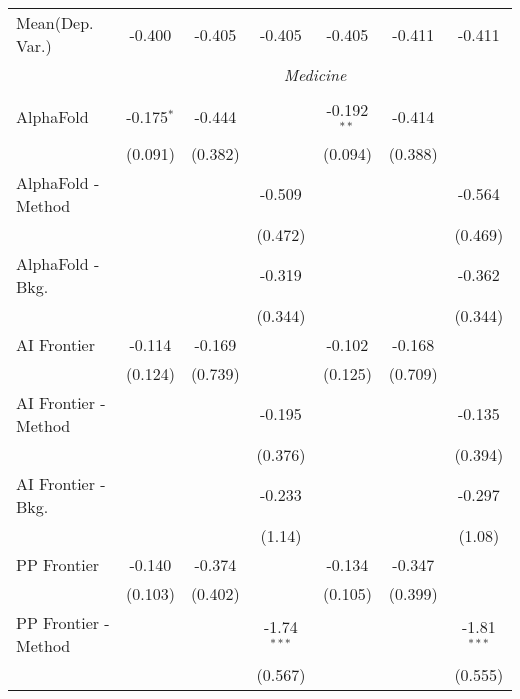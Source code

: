 \begin{tabular}{lcccccc}
Mean(Dep. Var.) & -0.400 & -0.405 & -0.405 & -0.405 & -0.411 & -0.411 \\
 & \multicolumn{6}{c}{\textit{Medicine}} \\ \\
   AlphaFold            & -0.175$^{*}$ & -0.444  &               & -0.192$^{**}$ & -0.414        &   \\   
                        & (0.091)      & (0.382) &               & (0.094)       & (0.388)       &   \\   
   AlphaFold - Method   &              &         & -0.509        &               &               & -0.564\\   
                        &              &         & (0.472)       &               &               & (0.469)\\   
   AlphaFold - Bkg.     &              &         & -0.319        &               &               & -0.362\\   
                        &              &         & (0.344)       &               &               & (0.344)\\   
   AI Frontier          & -0.114       & -0.169  &               & -0.102        & -0.168        &   \\   
                        & (0.124)      & (0.739) &               & (0.125)       & (0.709)       &   \\   
   AI Frontier - Method &              &         & -0.195        &               &               & -0.135\\   
                        &              &         & (0.376)       &               &               & (0.394)\\   
   AI Frontier - Bkg.   &              &         & -0.233        &               &               & -0.297\\   
                        &              &         & (1.14)        &               &               & (1.08)\\   
   PP Frontier          & -0.140       & -0.374  &               & -0.134        & -0.347        &   \\   
                        & (0.103)      & (0.402) &               & (0.105)       & (0.399)       &   \\   
   PP Frontier - Method &              &         & -1.74$^{***}$ &               &               & -1.81$^{***}$\\   
                        &              &         & (0.567)       &               &               & (0.555)\\   

\end{tabular}
